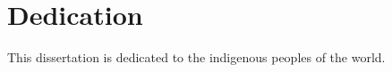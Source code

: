 \chapter*{Dedication}
\label{ch:dedication}

This dissertation is dedicated to the indigenous peoples of the world.  